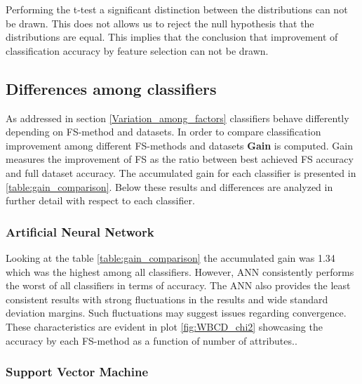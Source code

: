 


Performing the t-test a significant distinction between the distributions can not be drawn. This does not allows us to reject the null hypothesis that the distributions are equal. This implies that the conclusion that improvement of classification accuracy by feature selection can not be drawn.

\subsection{Differences among classifiers}

As addressed in section \ref{Variation_among_factors} classifiers behave differently depending on FS-method and datasets.
In order to compare classification improvement among different FS-methods and datasets \textbf{Gain} is computed. Gain measures the improvement of FS as the ratio between best achieved FS accuracy and full dataset accuracy. The accumulated gain for each classifier is presented in \ref{table:gain_comparison}. Below these results and differences are analyzed in further detail with respect to each classifier.

\begin{table}[hp]
  
  \caption[]%
  {{\small Ranking of which classifiers gained most accuracy when comparing feature selection to full dataset.}}
  \label{table:gain_comparison}
\end{table}

\subsubsection{Artificial Neural Network}

Looking at the table \ref{table:gain_comparison} the accumulated gain was 1.34 which was the highest among all classifiers. However, ANN consistently performs the worst of all classifiers in terms of accuracy. The ANN also provides the least consistent results with strong fluctuations in the results and wide standard deviation margins. Such fluctuations may suggest issues regarding convergence. These characteristics are evident in plot \ref{fig:WBCD_chi2} showcasing the accuracy by each FS-method as a function of number of attributes..

\subsubsection{Support Vector Machine}

